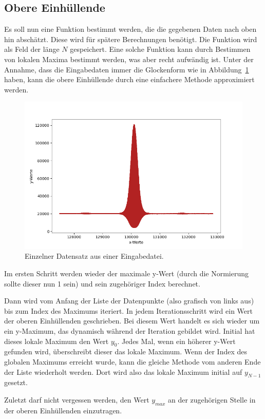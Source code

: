 \subsection{Obere Einhüllende}\label{subsec:ober-einh}
Es soll nun eine Funktion bestimmt werden, die die gegebenen Daten nach oben hin abschätzt.
Diese wird für spätere Berechnungen benötigt.
Die Funktion wird als Feld der länge $N$ gespeichert.
Eine solche Funktion kann durch Bestimmen von lokalen Maxima bestimmt werden, was aber recht aufwändig ist.
Unter der Annahme, dass die Eingabedaten immer die Glockenform wie in Abbildung~\ref{fig:eingabe-plot} haben, kann die obere Einhüllende durch eine einfachere Methode approximiert werden.
\begin{figure}[htb]
    \centering
    \includegraphics[width=0.8\linewidth]{images/EingabeInsgesamt}
    \caption{
        Einzelner Datensatz aus einer Eingabedatei.
    }
    \label{fig:eingabe-plot}
\end{figure}

Im ersten Schritt werden wieder der maximale y-Wert (durch die Normierung sollte dieser nun 1 sein) und sein zugehöriger Index berechnet.

Dann wird vom Anfang der Liste der Datenpunkte (also grafisch von links aus) bis zum Index des Maximums iteriert.
In jedem Iterationsschritt wird ein Wert der oberen Einhüllenden geschrieben.
Bei diesem Wert handelt es sich wieder um ein y-Maximum, das dynamisch während der Iteration gebildet wird.
Initial hat dieses lokale Maximum den Wert $y_0$.
Jedes Mal, wenn ein höherer y-Wert gefunden wird, überschreibt dieser das lokale Maximum.
Wenn der Index des globalen Maximums erreicht wurde, kann die gleiche Methode vom anderen Ende der Liste wiederholt werden.
Dort wird also das lokale Maximum initial auf $y_{N-1}$ gesetzt.

Zuletzt darf nicht vergessen werden, den Wert $y_{max}$ an der zugehörigen Stelle in der oberen Einhüllenden einzutragen.

